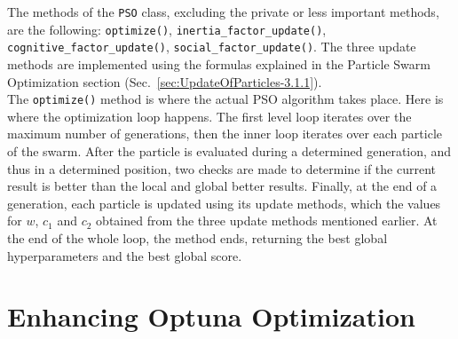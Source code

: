 %
The methods of the \texttt{PSO} class, excluding the private or less important methods, are the following: \texttt{optimize()}, \texttt{inertia\_factor\_update()}, \texttt{cognitive\_factor\_update()}, \texttt{social\_factor\_update()}.
The three update methods are implemented using the formulas explained in the Particle Swarm Optimization section (Sec.~\ref{sec:UpdateOfParticles-3.1.1}).
\\[0.3cm]The \texttt{optimize()} method is where the actual PSO algorithm takes place. Here is where the optimization loop happens. The first level loop iterates over the maximum number of generations, then the inner loop iterates over each particle of the swarm.
After the particle is evaluated during a determined generation, and thus in a determined position, two checks are made to determine if the current result is better than the local and global better results.
Finally, at the end of a generation, each particle is updated using its update methods, which the values for $w$, $c_1$ and $c_2$ obtained from the three update methods mentioned earlier.
At the end of the whole loop, the method ends, returning the best global hyperparameters and the best global score.

\section{Enhancing Optuna Optimization}\label{sec:EnhancingOptuna-3.3}

